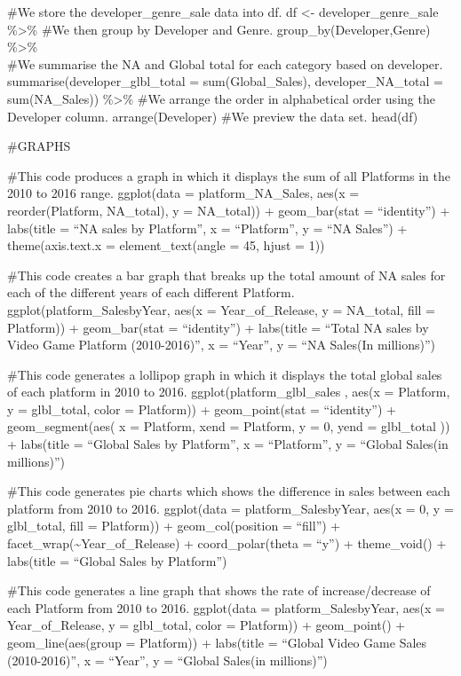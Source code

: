 \documentclass[
]{article}
\begin{document}
\#We store the developer\_genre\_sale data into df. df \textless-
developer\_genre\_sale \%\textgreater\% \#We then group by Developer and
Genre. group\_by(Developer,Genre) \%\textgreater\%\\
\#We summarise the NA and Global total for each category based on
developer. summarise(developer\_glbl\_total = sum(Global\_Sales),
developer\_NA\_total = sum(NA\_Sales)) \%\textgreater\% \#We arrange the
order in alphabetical order using the Developer column.
arrange(Developer) \#We preview the data set. head(df)

\#GRAPHS

\#This code produces a graph in which it displays the sum of all
Platforms in the 2010 to 2016 range. ggplot(data = platform\_NA\_Sales,
aes(x = reorder(Platform, NA\_total), y = NA\_total)) + geom\_bar(stat =
``identity'') + labs(title = ``NA sales by Platform'', x = ``Platform'',
y = ``NA Sales'') + theme(axis.text.x = element\_text(angle = 45, hjust
= 1))

\#This code creates a bar graph that breaks up the total amount of NA
sales for each of the different years of each different Platform.
ggplot(platform\_SalesbyYear, aes(x = Year\_of\_Release, y = NA\_total,
fill = Platform)) + geom\_bar(stat = ``identity'') + labs(title =
``Total NA sales by Video Game Platform (2010-2016)'', x = ``Year'', y =
``NA Sales\n(In millions)'')

\#This code generates a lollipop graph in which it displays the total
global sales of each platform in 2010 to 2016.
ggplot(platform\_glbl\_sales , aes(x = Platform, y = glbl\_total, color
= Platform)) + geom\_point(stat = ``identity'') + geom\_segment(aes( x =
Platform, xend = Platform, y = 0, yend = glbl\_total )) + labs(title =
``Global Sales by Platform'', x = ``Platform'', y = ``Global Sales\n(in
millions)'')

\#This code generates pie charts which shows the difference in sales
between each platform from 2010 to 2016. ggplot(data =
platform\_SalesbyYear, aes(x = 0, y = glbl\_total, fill = Platform)) +
geom\_col(position = ``fill'') +
facet\_wrap(\textasciitilde Year\_of\_Release) + coord\_polar(theta =
``y'') + theme\_void() + labs(title = ``Global Sales by Platform'')

\#This code generates a line graph that shows the rate of
increase/decrease of each Platform from 2010 to 2016. ggplot(data =
platform\_SalesbyYear, aes(x = Year\_of\_Release, y = glbl\_total, color
= Platform)) + geom\_point() + geom\_line(aes(group = Platform)) +
labs(title = ``Global Video Game Sales (2010-2016)'', x = ``Year'', y =
``Global Sales\n(in millions)'')
\end{document}
